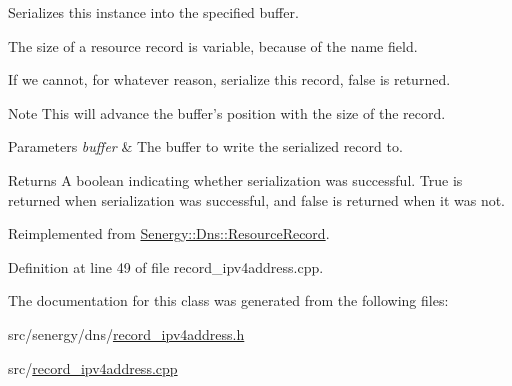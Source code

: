 Serializes this instance into the specified buffer. 

The size of a resource record is variable, because of the name field.

If we cannot, for whatever reason, serialize this record, false is returned.

\begin{DoxyNote}{Note}
This will advance the buffer's position with the size of the record.
\end{DoxyNote}

\begin{DoxyParams}{Parameters}
{\em buffer} & The buffer to write the serialized record to.\\
\hline
\end{DoxyParams}
\begin{DoxyReturn}{Returns}
A boolean indicating whether serialization was successful. True is returned when serialization was successful, and false is returned when it was not. 
\end{DoxyReturn}


Reimplemented from \hyperlink{class_senergy_1_1_dns_1_1_resource_record_ad76b4f450fc1d7f0bd0bbf72c3f68a11}{Senergy\-::\-Dns\-::\-Resource\-Record}.



Definition at line 49 of file record\-\_\-ipv4address.\-cpp.



The documentation for this class was generated from the following files\-:\begin{DoxyCompactItemize}
\item 
src/senergy/dns/\hyperlink{record__ipv4address_8h}{record\-\_\-ipv4address.\-h}\item 
src/\hyperlink{record__ipv4address_8cpp}{record\-\_\-ipv4address.\-cpp}\end{DoxyCompactItemize}
